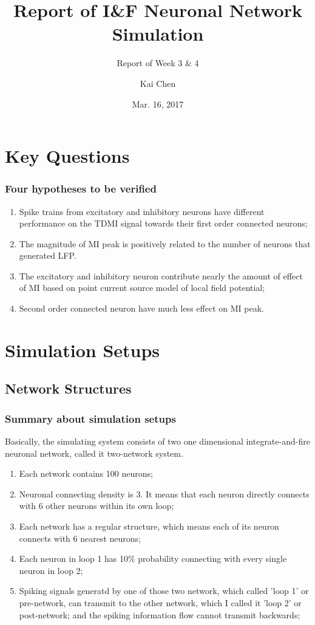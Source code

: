\documentclass{beamer}
\title{Report of I\&F Neuronal Network Simulation}
\subtitle{Report of Week 3 \& 4}
\author{Kai Chen}
\date{Mar. 16, 2017}
\begin{document}
	\frame{\titlepage}
	\section{Key Questions}
	\begin{frame}
		\frametitle{Four hypotheses to be verified}
		\begin{enumerate}[*]
			\item Spike trains from excitatory and inhibitory neurons have different performance on the TDMI signal towards their first order connected neurons; 
			\item The magnitude of MI peak is positively related to the number of neurons that generated LFP.
			\item The excitatory and inhibitory neuron contribute nearly the amount of effect of MI based on point current source model of local field potential;		
			\item Second order connected neuron have much less effect on MI peak.
		\end{enumerate}
	\end{frame}
	\section{Simulation Setups}
	\subsection{Network Structures}
	\begin{frame}
		\frametitle{Summary about simulation setups}
		Basically, the simulating system consists of two one dimensional integrate-and-fire neuronal network, called it two-network system. 
		\begin{enumerate}
			\item Each network contains 100 neurons;
			\item Neuronal connecting density is 3. It means that each neuron directly connects with 6 other neurons within its own loop;
			\item Each network has a regular structure, which means each of its neuron connects with 6 nearest neurons;
			\item Each neuron in loop 1 has 10\% probability connecting with every single neuron in loop 2;
			\item Spiking signals generatd by one of those two network, which called 'loop 1' or pre-network, can transmit to the other network, which I called it 'loop 2' or post-network; and the spiking information flow cannot transmit backwards;
		\end{enumerate}		
	\end{frame}
\end{document}
